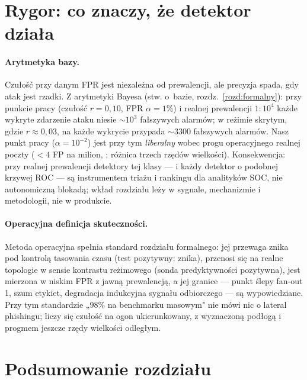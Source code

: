 \section{Rygor: co znaczy, że detektor działa}
\label{sec:k-rygor}

\paragraph{Arytmetyka bazy.} Czułość przy danym FPR jest niezależna
od prewalencji, ale precyzja spada, gdy atak jest rzadki. Z
arytmetyki Bayesa (stw. o~bazie, rozdz.~\ref{rozd:formalny}): przy
punkcie pracy (czułość $r{=}0{,}10$, FPR $\alpha{=}1\%$) i realnej
prewalencji $1{:}10^4$ każde wykryte zdarzenie ataku niesie
$\sim\!10^3$ fałszywych alarmów; w reżimie skrytym, gdzie
$r\approx0{,}03$, na każde wykrycie przypada $\sim\!3300$ fałszywych
alarmów. Nasz punkt pracy ($\alpha=10^{-2}$) jest przy tym
\emph{liberalny} wobec progu operacyjnego realnej poczty
($<\!4$ FP na milion, \citealp{ho2019detecting}; różnica trzech
rzędów wielkości). Konsekwencja: przy realnej prewalencji detektory
tej klasy --- i każdy detektor o podobnej krzywej ROC --- są
instrumentem triażu i rankingu dla analityków SOC, nie autonomiczną
blokadą; wkład rozdziału leży w sygnale, mechanizmie i metodologii,
nie w produkcie.

\paragraph{Operacyjna definicja skuteczności.} Metoda operacyjna
spełnia standard rozdziału formalnego: jej przewaga znika pod
kontrolą tasowania czasu (test pozytywny: znika), przenosi się
na realne topologie w sensie kontrastu reżimowego (sonda
predyktywności pozytywna), jest mierzona w niskim FPR z jawną
prewalencją, a jej granice --- punkt ślepy fan-out 1, szum etykiet,
degradacja indukcyjna sygnału odbiorczego --- są wypowiedziane.
Przy tym standardzie „98\% na benchmarku masowym" nie mówi nic
o lateral phishingu; liczy się czułość na ogon ukierunkowany,
z wyznaczoną podłogą i progmem jeszcze rzędy wielkości odległym.

\section{Podsumowanie rozdziału}
\label{sec:k-podsumowanie}

